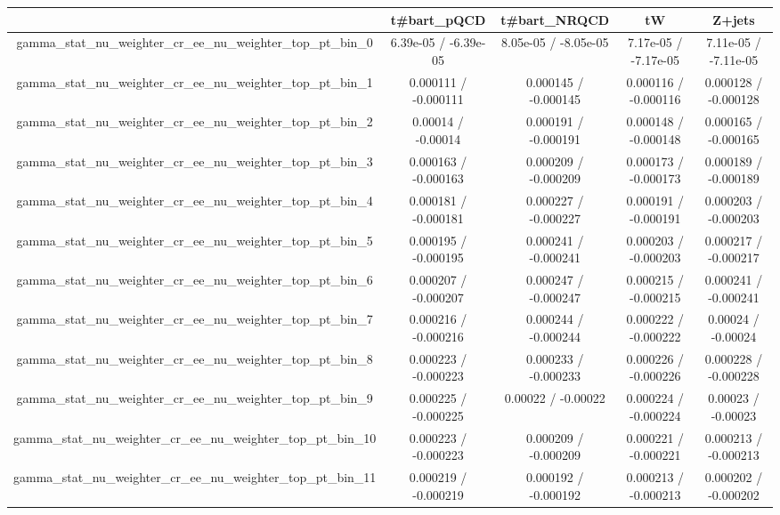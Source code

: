 \documentclass[10pt]{article}
\begin{document}
\begin{table}[htbp]
\begin{center}
\begin{tabular}{|c|c|c|c|c|}
\hline 
      & t#bar{t}_{pQCD}      & t#bar{t}_{NRQCD}      & tW      & Z+jets \\ 
\hline 
  gamma_stat_nu_weighter_cr_ee_nu_weighter_top_pt_bin_0 & 6.39e-05 / -6.39e-05 & 8.05e-05 / -8.05e-05 & 7.17e-05 / -7.17e-05 & 7.11e-05 / -7.11e-05 \\ 
  gamma_stat_nu_weighter_cr_ee_nu_weighter_top_pt_bin_1 & 0.000111 / -0.000111 & 0.000145 / -0.000145 & 0.000116 / -0.000116 & 0.000128 / -0.000128 \\ 
  gamma_stat_nu_weighter_cr_ee_nu_weighter_top_pt_bin_2 & 0.00014 / -0.00014 & 0.000191 / -0.000191 & 0.000148 / -0.000148 & 0.000165 / -0.000165 \\ 
  gamma_stat_nu_weighter_cr_ee_nu_weighter_top_pt_bin_3 & 0.000163 / -0.000163 & 0.000209 / -0.000209 & 0.000173 / -0.000173 & 0.000189 / -0.000189 \\ 
  gamma_stat_nu_weighter_cr_ee_nu_weighter_top_pt_bin_4 & 0.000181 / -0.000181 & 0.000227 / -0.000227 & 0.000191 / -0.000191 & 0.000203 / -0.000203 \\ 
  gamma_stat_nu_weighter_cr_ee_nu_weighter_top_pt_bin_5 & 0.000195 / -0.000195 & 0.000241 / -0.000241 & 0.000203 / -0.000203 & 0.000217 / -0.000217 \\ 
  gamma_stat_nu_weighter_cr_ee_nu_weighter_top_pt_bin_6 & 0.000207 / -0.000207 & 0.000247 / -0.000247 & 0.000215 / -0.000215 & 0.000241 / -0.000241 \\ 
  gamma_stat_nu_weighter_cr_ee_nu_weighter_top_pt_bin_7 & 0.000216 / -0.000216 & 0.000244 / -0.000244 & 0.000222 / -0.000222 & 0.00024 / -0.00024 \\ 
  gamma_stat_nu_weighter_cr_ee_nu_weighter_top_pt_bin_8 & 0.000223 / -0.000223 & 0.000233 / -0.000233 & 0.000226 / -0.000226 & 0.000228 / -0.000228 \\ 
  gamma_stat_nu_weighter_cr_ee_nu_weighter_top_pt_bin_9 & 0.000225 / -0.000225 & 0.00022 / -0.00022 & 0.000224 / -0.000224 & 0.00023 / -0.00023 \\ 
  gamma_stat_nu_weighter_cr_ee_nu_weighter_top_pt_bin_10 & 0.000223 / -0.000223 & 0.000209 / -0.000209 & 0.000221 / -0.000221 & 0.000213 / -0.000213 \\ 
  gamma_stat_nu_weighter_cr_ee_nu_weighter_top_pt_bin_11 & 0.000219 / -0.000219 & 0.000192 / -0.000192 & 0.000213 / -0.000213 & 0.000202 / -0.000202 \\ 

\end{tabular}
\end{center}
\end{table}
\end{document}
